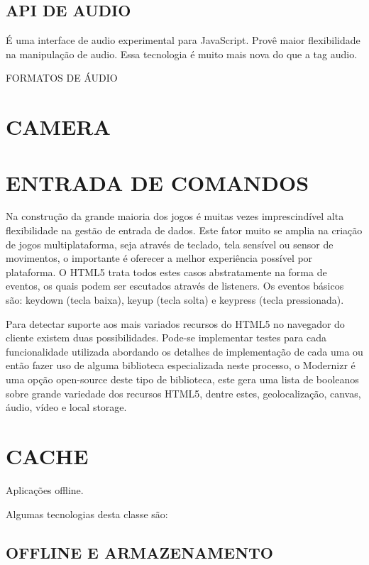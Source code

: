 \documentclass[11pt,a4paper]{article}
\begin{document}
\subsection{API DE AUDIO}

É uma interface de audio experimental para JavaScript. Provê maior
flexibilidade na manipulação de audio. Essa tecnologia é muito mais
nova do que a tag audio. 

FORMATOS DE ÁUDIO

\section{CAMERA}

\section{ ENTRADA DE COMANDOS}

Na construção da grande maioria dos jogos é muitas vezes
imprescindível alta flexibilidade na gestão de entrada de dados.
Este fator muito se amplia na criação de jogos multiplataforma,
seja através de teclado, tela sensível ou sensor de movimentos, o
importante é oferecer a melhor experiência possível por plataforma.
O HTML5 trata todos estes casos abstratamente na forma de eventos, os
quais podem ser escutados através de listeners. Os eventos básicos
são: keydown (tecla baixa), keyup (tecla solta) e keypress (tecla
pressionada).

Para detectar suporte aos mais variados recursos do HTML5 no navegador
do cliente existem duas possibilidades. Pode-se implementar testes para
cada funcionalidade utilizada abordando os detalhes de implementação
de cada uma ou então fazer uso de alguma biblioteca especializada
neste processo, o Modernizr é uma opção open-source deste tipo de
biblioteca, este gera uma lista de booleanos sobre grande variedade dos
recursos HTML5, dentre estes, geolocalização, canvas, áudio, vídeo e
local storage.

\section{CACHE}

Aplicações offline.

Algumas tecnologias desta classe são:

\subsection{ OFFLINE E ARMAZENAMENTO}
\end{document}
